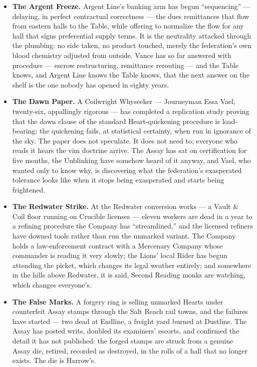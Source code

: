 \begin{itemize}
    \item \textbf{The Argent Freeze.} Argent Line's banking arm has begun ``sequencing'' --- delaying, in perfect contractual correctness --- the dues remittances that flow from eastern halls to the Table, while offering to normalize the flow for any hall that signs preferential supply terms. It is the neutrality attacked through the plumbing: no side taken, no product touched, merely the federation's own blood chemistry adjusted from outside. Vance has so far answered with procedure --- escrow restructuring, remittance rerouting --- and the Table knows, and Argent Line knows the Table knows, that the next answer on the shelf is the one nobody has opened in eighty years.
    \item \textbf{The Dawn Paper.} A Coilwright Whyseeker --- Journeyman Essa Vael, twenty-six, appallingly rigorous --- has completed a replication study proving that the dawn clause of the standard Heart-quickening procedure is load-bearing: the quickening fails, at statistical certainty, when run in ignorance of the sky. The paper does not speculate. It does not need to; everyone who reads it hears the vim doctrine arrive. The Assay has sat on certification for five months, the Unblinking have somehow heard of it anyway, and Vael, who wanted only to know why, is discovering what the federation's exasperated tolerance looks like when it stops being exasperated and starts being frightened.
    \item \textbf{The Redwater Strike.} At the Redwater conversion works --- a Vault \& Coil floor running on Crucible licenses --- eleven workers are dead in a year to a refining procedure the Company has ``streamlined,'' and the licensed refiners have downed tools rather than run the unmarked variant. The Company holds a law-enforcement contract with a Mercenary Company whose commander is reading it very slowly; the Lions' local Rider has begun attending the picket, which changes its legal weather entirely; and somewhere in the hills above Redwater, it is said, Second Reading monks are watching, which changes everyone's.
    \item \textbf{The False Marks.} A forgery ring is selling unmarked Hearts under counterfeit Assay stamps through the Salt Reach rail towns, and the failures have started --- two dead at Endline, a freight yard burned at Dustline. The Assay has posted writs, doubled its examiners' escorts, and confirmed the detail it has not published: the forged stamps are struck from a genuine Assay die, retired, recorded as destroyed, in the rolls of a hall that no longer exists. The die is Harrow's.

\end{itemize}
